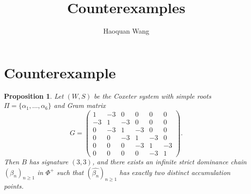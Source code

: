 \documentclass[11pt,reqno]{amsart}
\title[Counterexamples]
{Counterexamples}
\author{Haoquan Wang}
\theoremstyle{plain}
\newtheorem{proposition}[theorem]{Proposition}
\theoremstyle{definition}
\theoremstyle{remark}
\numberwithin{equation}{section}
\begin{document}

\begin{abstract}

\end{abstract}

\maketitle
\section{Counterexample}
\begin{proposition}
Let $(W,S)$ be the Coxeter system with simple roots
$\Pi=\{\alpha_1,\ldots,\alpha_6\}$ and Gram matrix
\[
G=
\begin{pmatrix}
1&-3&0&0&0&0\\
-3&1&-3&0&0&0\\
0&-3&1&-3&0&0\\
0&0&-3&1&-3&0\\
0&0&0&-3&1&-3\\
0&0&0&0&-3&1
\end{pmatrix}.
\]
Then $B$ has signature $(3,3)$, and there exists an infinite strict
dominance chain $(\beta_n)_{n\geq1}$ in $\Phi^+$ such that
$(\widehat{\beta_n})_{n\geq1}$ has exactly two distinct accumulation
points.
\end{proposition}
\end{document}
